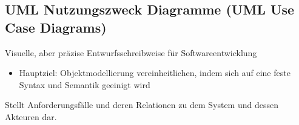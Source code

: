 \documentclass[
    ngerman,
    color=3b,
    summary,
    boxarc,
    main,
]{rubos-tuda-template}
\begin{document}
\subsection{UML Nutzungszweck Diagramme (UML Use Case Diagrams)}
\begin{definition}
    Visuelle, aber präzise Entwurfsschreibweise für Softwareentwicklung
    \begin{itemize}
        \item Hauptziel: Objektmodellierung vereinheitlichen, indem sich auf eine feste Syntax und Semantik geeinigt wird
    \end{itemize}
\end{definition}
\begin{definition}
    Stellt Anforderungsfälle und deren Relationen zu dem System und dessen Akteuren dar.
\end{definition}
\end{document}
